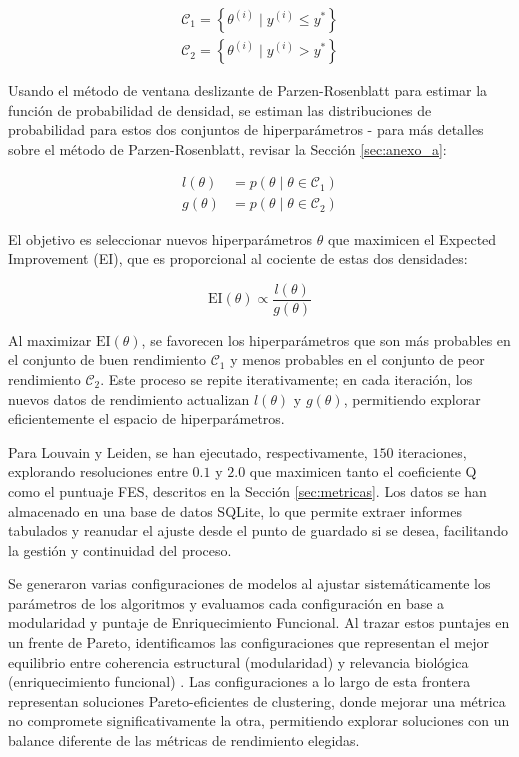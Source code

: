 \begin{equation}
	\begin{aligned}
		\mathcal{C}_1 = \left\{ \theta^{(i)} \mid y^{(i)} \leq y^* \right\} \\
		\mathcal{C}_2 = \left\{ \theta^{(i)} \mid y^{(i)} > y^* \right\}
	\end{aligned}
\end{equation}

Usando el método de ventana deslizante de Parzen-Rosenblatt para estimar la función de probabilidad de densidad, se estiman las distribuciones de probabilidad para estos dos conjuntos de hiperparámetros - para más detalles sobre el método de Parzen-Rosenblatt, revisar la Sección \ref{sec:anexo_a}:

\begin{equation}
	\begin{aligned}
		l(\theta) &= p(\theta \mid \theta \in \mathcal{C}_1) \\
		g(\theta) &= p(\theta \mid \theta \in \mathcal{C}_2)
	\end{aligned}
\end{equation}

El objetivo es seleccionar nuevos hiperparámetros \( \theta \) que maximicen el Expected Improvement (EI), que es proporcional al cociente de estas dos densidades:

\begin{equation}
	\mathrm{EI}(\theta) \propto \frac{l(\theta)}{g(\theta)}
\end{equation}

Al maximizar \( \mathrm{EI}(\theta) \), se favorecen los hiperparámetros que son más probables en el conjunto de buen rendimiento \( \mathcal{C}_1 \) y menos probables en el conjunto de peor rendimiento \( \mathcal{C}_2 \). Este proceso se repite iterativamente; en cada iteración, los nuevos datos de rendimiento actualizan \( l(\theta) \) y \( g(\theta) \), permitiendo explorar eficientemente el espacio de hiperparámetros.

Para Louvain y Leiden, se han ejecutado, respectivamente, \(150\) iteraciones, explorando resoluciones entre \(0.1\) y \(2.0\) que maximicen tanto el coeficiente Q como el puntuaje FES, descritos en la Sección \ref{sec:metricas}. Los datos se han almacenado en una base de datos SQLite, lo que permite extraer informes tabulados y reanudar el ajuste desde el punto de guardado si se desea, facilitando la gestión y continuidad del proceso.

Se generaron varias configuraciones de modelos al ajustar sistemáticamente los parámetros de los algoritmos y evaluamos cada configuración en base a modularidad y puntaje de Enriquecimiento Funcional. Al trazar estos puntajes en un frente de Pareto, identificamos las configuraciones que representan el mejor equilibrio entre coherencia estructural (modularidad) y relevancia biológica (enriquecimiento funcional) \cite{goodarzi2014PARETOFRONT1,jahan2013multiPARETOFRONT2,costa2015paretoPARETOFRONT3}. Las configuraciones a lo largo de esta frontera representan soluciones Pareto-eficientes de clustering, donde mejorar una métrica no compromete significativamente la otra, permitiendo explorar soluciones con un balance diferente de las métricas de rendimiento elegidas.


